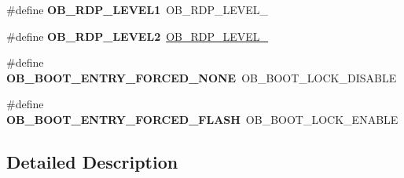 \begin{DoxyCompactItemize}
\item 
\mbox{\label{group___h_a_l___f_l_a_s_h___aliased___defines_ga7291ec039ae68ee1471af8ef3310d326}} 
\#define {\bfseries O\+B\+\_\+\+R\+D\+P\+\_\+\+L\+E\+V\+E\+L1}~O\+B\+\_\+\+R\+D\+P\+\_\+\+L\+E\+V\+E\+L\+\_
\item 
\mbox{\label{group___h_a_l___f_l_a_s_h___aliased___defines_gae591fa55ccad5cc27b322a5fba9d6ca1}} 
\#define {\bfseries O\+B\+\_\+\+R\+D\+P\+\_\+\+L\+E\+V\+E\+L2}~\hyperlink{group___f_l_a_s_h_ex___option___bytes___read___protection_ga2262afca565429ce2808d835c49e5ee6}{O\+B\+\_\+\+R\+D\+P\+\_\+\+L\+E\+V\+E\+L\+\_}
\item 
\mbox{\label{group___h_a_l___f_l_a_s_h___aliased___defines_ga666d4ab8a89488eaf7d2182abea35d52}} 
\#define {\bfseries O\+B\+\_\+\+B\+O\+O\+T\+\_\+\+E\+N\+T\+R\+Y\+\_\+\+F\+O\+R\+C\+E\+D\+\_\+\+N\+O\+NE}~O\+B\+\_\+\+B\+O\+O\+T\+\_\+\+L\+O\+C\+K\+\_\+\+D\+I\+S\+A\+B\+LE
\item 
\mbox{\label{group___h_a_l___f_l_a_s_h___aliased___defines_gaecdfae7720771db018195097858fff93}} 
\#define {\bfseries O\+B\+\_\+\+B\+O\+O\+T\+\_\+\+E\+N\+T\+R\+Y\+\_\+\+F\+O\+R\+C\+E\+D\+\_\+\+F\+L\+A\+SH}~O\+B\+\_\+\+B\+O\+O\+T\+\_\+\+L\+O\+C\+K\+\_\+\+E\+N\+A\+B\+LE
\end{DoxyCompactItemize}


\subsection{Detailed Description}
